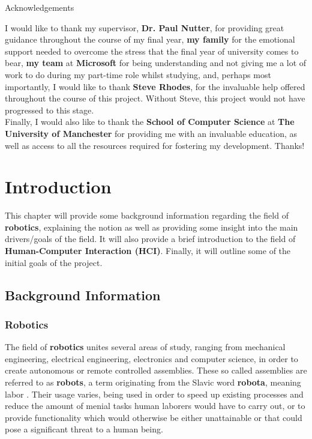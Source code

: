 \documentclass[12p,a4paper]{report}
\begin{document}
\newpage


\vspace*{150pt}
\begin{center} \Large Acknowledgements

\end{center}

\vspace{15pt}

I would like to thank my supervisor, \textbf{Dr. Paul Nutter}, for providing great guidance throughout the course of my final year, \textbf{my family }for the emotional support needed to overcome the stress that the final year of university comes to bear, \textbf{my team} at \textbf{Microsoft} for being understanding and not giving me a lot
of work to do during my part-time role whilst studying, and, perhaps most importantly, I would like to thank \textbf{Steve Rhodes}, for the invaluable help offered throughout the course of this project. Without Steve, this project would not have progressed to this stage. \\

Finally, I would also like to thank the \textbf{School of Computer Science} at \textbf{The University of Manchester} for providing me with an invaluable education, as well as access to all the resources required for fostering my development. Thanks!

\newpage

\tableofcontents

\newpage

\listoffigures
\newpage
\sectionfont{\huge}
\subsectionfont{\LARGE}
\partfont{\Large}

\chapter{Introduction}
This chapter will provide some background information regarding the field of \textbf{robotics}, explaining the notion as well as providing some insight into the main drivers/goals of the field. It will also provide a brief introduction to the field of \textbf{Human-Computer Interaction (HCI)}. Finally, it will outline some of the initial goals of the project.

\section{Background Information}
\subsection{Robotics}
The field of \textbf{robotics} unites several areas of study, ranging from mechanical engineering, electrical engineering, electronics and computer science, in order to create autonomous or remote controlled assemblies. These so called assemblies are referred to as \textbf{robots}, a term originating from the Slavic word \textbf{robota}, meaning labor \cite{robota}. Their usage varies, being used in order to speed up existing processes and reduce the amount of menial tasks human laborers would have to carry out, or to provide functionality which would otherwise be either unattainable or that could pose a significant threat to a human being. \\
\end{document}

